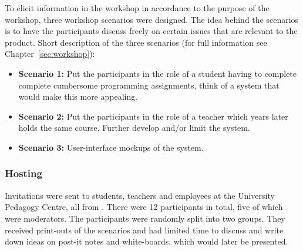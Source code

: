 To elicit information in the workshop in accordance to the purpose of the workshop, three workshop scenarios were designed. The idea behind the scenarios is to have the participants discuss freely on certain issues that are relevant to the product. Short description of the three scenarios (for full information see Chapter~\ref{sec:workshop}):
\begin{itemize}  
    \item \textbf{Scenario 1:} Put the participants in the role of a student having to complete complete cumbersome programming assignments, think of a system that would make this more appealing.
    \item \textbf{Scenario 2:} Put the participants in the role of a teacher which years later holds the same course. Further develop and/or limit the system.
    \item \textbf{Scenario 3:} User-interface mockups of the system.
\end{itemize}
    
\subsubsection{Hosting}
Invitations were sent to students, teachers and employees at the University Pedagogy Centre, all from \LTU{}. There were 12 participants in total, five of which were moderators. The participants were randomly split into two groups. They received print-outs of the scenarios and had limited time to discuss and write down ideas on post-it notes and white-boards, which would later be presented.

